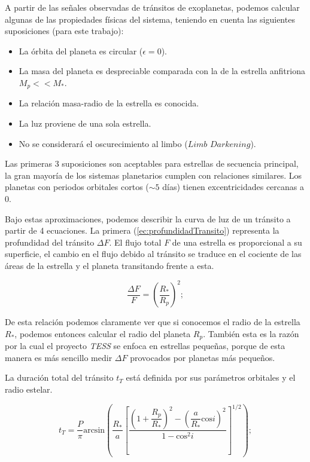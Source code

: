 A partir de las señales observadas de tránsitos de exoplanetas, podemos calcular algunas de las propiedades físicas del sistema, teniendo en cuenta las siguientes suposiciones (para este trabajo):

\begin{itemize}
\item La órbita del planeta es circular ($\epsilon = 0$).
\item La masa del planeta es despreciable comparada con la de la estrella anfitriona \\ $M_{p} << M_{*}$.
\item La relación masa-radio de la estrella es conocida.
\item La luz proviene de una sola estrella.
\item No se considerará el oscurecimiento al limbo ($\textit{Limb Darkening}$).
\end{itemize}

Las primeras 3 suposiciones son aceptables para estrellas de secuencia principal, la gran mayoría de los sistemas planetarios cumplen con relaciones similares. Los planetas con periodos orbitales cortos ($\sim 5$ días) tienen excentricidades cercanas a 0.

Bajo estas aproximaciones, podemos describir la curva de luz de un tránsito a partir de 4 ecuaciones. La primera (\ref{ec:profundidadTransito}) representa la profundidad del tránsito $\Delta F$. El flujo total $F$ de una estrella es proporcional a su superficie, el cambio en el flujo debido al tránsito se traduce en el cociente de las áreas de la estrella y el planeta transitando frente a esta.

\begin{equation}
	\label{ec:profundidadTransito}
  \displaystyle \dfrac{\Delta F}{F}=\left(\dfrac{R_*}{R_p} \right)^{2} ;
\end{equation}

De esta relación podemos claramente ver que si conocemos el radio de la estrella $R_{*}$, podemos entonces calcular el radio del planeta $R_{p}$. También esta es la razón por la cual el proyecto \textit{TESS} se enfoca en estrellas pequeñas, porque de esta manera es más sencillo medir $\Delta F$ provocados por planetas más pequeños.

La duración total del tránsito $t_{T}$ está definida por sus parámetros orbitales y el radio estelar.

\begin{equation}
\label{ec:tiempoTransito}
\displaystyle t_{T}=\dfrac{P}{\pi} \mbox{arcsin} \left(\dfrac{R_{*}}{a}\left[ \dfrac{\left( 1+\dfrac{R_{p}}{R_{*}}\right)^{2}-\left( \dfrac{a}{R_{*}} \mbox{cos} i\right)^{2}}{1-\mbox{cos}^{2}i} \right]^{1/2}  \right); 
\end{equation}

